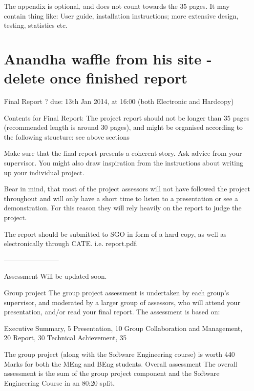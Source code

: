 \documentclass[a4wide, 11pt]{article} \usepackage{a4, fullpage}
\begin{document}
The appendix is optional, and does not count towards the 35 pages. It may contain thing like: User guide, installation instructions; more extensive design, testing, statistics etc.

\section{Anandha waffle from his site - delete once finished report}

Final Report ? due: 13th Jan 2014, at 16:00 (both Electronic and Hardcopy)

Contents for Final Report: The project report should not be longer than 35 pages (recommended length is around 30 pages), and might be organised according to the following structure: see above sections

Make sure that the final report presents a coherent story. Ask advice from your supervisor. You might also draw inspiration from the instructions about writing up your individual project.

Bear in mind, that most of the project assessors will not have followed the project throughout and will only have a short time to listen to a presentation or see a demonstration. For this reason they will rely heavily on the report to judge the project.

The report should be submitted to SGO in form of a hard copy, as well as electronically through CATE. i.e. report.pdf. 

------------------------

Assessment
Will be updated soon.

Group project
The group project assessment is undertaken by each group's supervisor, and moderated by a larger group of assessors, who will attend your presentation, and/or read your final report. The assessment is based on:

    Executive Summary, 5
    Presentation, 10
    Group Collaboration and Management, 20
    Report, 30
    Technical Achievement, 35

The group project (along with the Software Engineering course) is worth 440 Marks for both the MEng and BEng students.
Overall assessment
The overall assessment is the sum of the group project component and the Software Engineering Course in an 80:20 split. 
\end{document}
